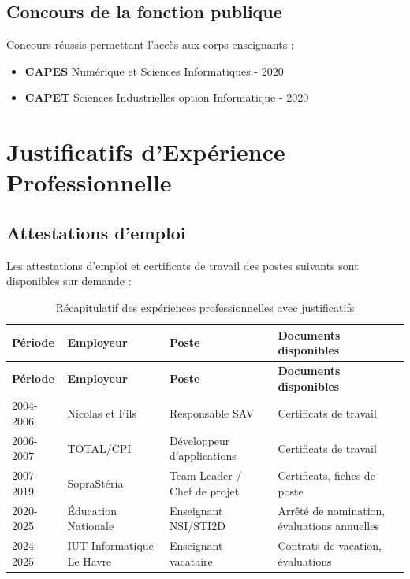\subsection{Concours de la fonction publique}
Concours réussis permettant l'accès aux corps enseignants :

\begin{itemize}[leftmargin=*]
    \item \textbf{CAPES} Numérique et Sciences Informatiques - 2020
    \item \textbf{CAPET} Sciences Industrielles option Informatique - 2020
\end{itemize}

\section{Justificatifs d'Expérience Professionnelle}

\subsection{Attestations d'emploi}
Les attestations d'emploi et certificats de travail des postes suivants sont disponibles sur demande :

\begin{longtable}{|p{3cm}|p{4cm}|p{3cm}|p{4cm}|}
\caption{Récapitulatif des expériences professionnelles avec justificatifs} \\
\hline
\textbf{Période} & \textbf{Employeur} & \textbf{Poste} & \textbf{Documents disponibles} \\
\hline
\endfirsthead
\hline
\textbf{Période} & \textbf{Employeur} & \textbf{Poste} & \textbf{Documents disponibles} \\
\hline
\endhead

2004-2006 & Nicolas et Fils & Responsable SAV & Certificats de travail \\
\hline

2006-2007 & TOTAL/CPI & Développeur d'applications & Certificats de travail \\
\hline

2007-2019 & SopraStéria & Team Leader / Chef de projet & Certificats, fiches de poste \\
\hline

2020-2025 & Éducation Nationale & Enseignant NSI/STI2D & Arrêté de nomination, évaluations annuelles \\
\hline

2024-2025 & IUT Informatique Le Havre & Enseignant vacataire & Contrats de vacation, évaluations \\
\hline

\end{longtable}

